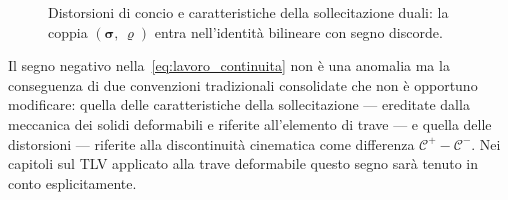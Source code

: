 \begin{figure}[htbp]
{%
	}
	\caption{Distorsioni di concio e caratteristiche della 
		sollecitazione duali: la coppia $(\bm{\sigma},\,\bm{\varrho})$ entra 
		nell'identità bilineare con segno discorde.}
	\label{fig:distorsioni_concio}
\end{figure}



\begin{oss}
	Il segno negativo nella~\eqref{eq:lavoro_continuita}
	non è una anomalia ma la conseguenza di due
	convenzioni tradizionali consolidate che non
	è opportuno modificare: quella delle
	caratteristiche della sollecitazione --- ereditate
	dalla meccanica dei solidi deformabili e riferite
	all'elemento di trave --- e quella delle
	distorsioni --- riferite alla discontinuità
	cinematica come differenza $\mathcal{C}^+ -
	\mathcal{C}^-$. Nei capitoli sul TLV applicato
	alla trave deformabile questo segno sarà
	tenuto in conto esplicitamente.
\end{oss}

